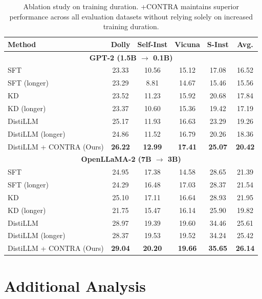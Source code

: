 \documentclass{article} %
\theoremstyle{definition}
\theoremstyle{remark}
\begin{document}
\begin{table}[htbp]
\centering
\small
\caption{Ablation study on training duration. +CONTRA maintains superior performance across all evaluation datasets without relying solely on increased training duration.}
\label{tab:extended_training_ablation}
\vspace{0.5em}
\begin{tabular}{lccccc}
\toprule
\textbf{Method} & \textbf{Dolly} & \textbf{Self-Inst} & \textbf{Vicuna} & \textbf{S-Inst} & \textbf{Avg.} \\
\midrule
\multicolumn{6}{c}{\textbf{GPT-2 (1.5B $\rightarrow$ 0.1B)}} \\
\midrule
SFT & 23.33 & 10.56 & 15.12 & 17.08 & 16.52 \\
SFT (longer) & 23.29 & 8.81 & 14.67 & 15.46 & 15.56 \\
KD & 23.52 & 11.23 & 15.92 & 20.68 & 17.84 \\
KD (longer) & 23.37 & 10.60 & 15.36 & 19.42 & 17.19 \\
DistiLLM & 25.17 & 11.93 & 16.63 & 23.29 & 19.26 \\
DistiLLM (longer) & 24.86 & 11.52 & 16.79 & 20.26 & 18.36 \\
\midrule
DistiLLM + CONTRA (Ours) & \textbf{26.22} & \textbf{12.99} & \textbf{17.41} & \textbf{25.07} & \textbf{20.42} \\
\midrule
\multicolumn{6}{c}{\textbf{OpenLLaMA-2 (7B $\rightarrow$ 3B)}} \\
\midrule
SFT & 24.95 & 17.38 & 14.58 & 28.65 & 21.39 \\
SFT (longer) & 24.29 & 16.48 & 17.03 & 28.37 & 21.54 \\
KD & 25.10 & 17.11 & 16.64 & 28.93 & 21.95 \\
KD (longer) & 21.75 & 15.47 & 16.14 & 25.90 & 19.82 \\
DistiLLM & 28.97 & 19.39 & 19.60 & 34.46 & 25.61 \\
DistiLLM (longer) & 28.37 & 19.53 & 19.52 & 34.24 & 25.42 \\
\midrule
DistiLLM + CONTRA (Ours) & \textbf{29.04} & \textbf{20.20} & \textbf{19.66} & \textbf{35.65} & \textbf{26.14} \\
\bottomrule
\end{tabular}
\end{table}



\section{Additional Analysis}
\label{app:ablation}
\end{document}
